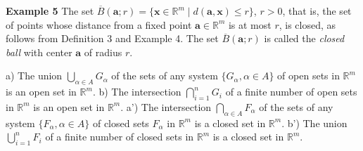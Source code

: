 \textbf{Example 5} The set $\overline{B}(\mathbf{a}; r) = \{\mathbf{x} \in \mathbb{R}^m \mid d(\mathbf{a}, \mathbf{x}) \le r\}$, $r > 0$, that is, the set of points
whose distance from a fixed point $\mathbf{a} \in \mathbb{R}^m$ is at most $r$, is closed, as follows from
Definition 3 and Example 4. The set $\overline{B}(\mathbf{a}; r)$ is called the \emph{closed ball} with center $\mathbf{a}$
of radius $r$.

\begin{proposition} \label{prop:open_closed_sets} a) The union $\bigcup_{\alpha \in A} G_\alpha$ of the sets of any system $\{G_\alpha, \alpha \in A\}$ of open
sets in $\mathbb{R}^m$ is an open set in $\mathbb{R}^m$.
b) The intersection $\bigcap_{i=1}^n G_i$ of a finite number of open sets in $\mathbb{R}^m$ is an open set
in $\mathbb{R}^m$.
a') The intersection $\bigcap_{\alpha \in A} F_\alpha$ of the sets of any system $\{F_\alpha, \alpha \in A\}$ of closed sets
$F_\alpha$ in $\mathbb{R}^m$ is a closed set in $\mathbb{R}^m$.
b') The union $\bigcup_{i=1}^n F_i$ of a finite number of closed sets in $\mathbb{R}^m$ is a closed set
in $\mathbb{R}^m$.
\end{proposition}